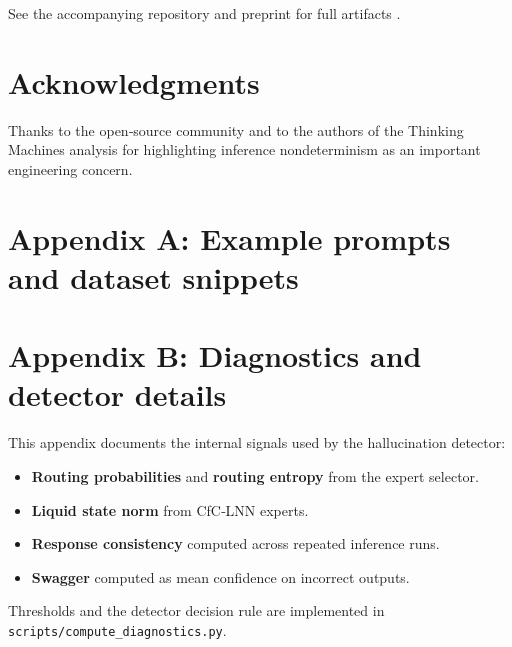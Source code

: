 \documentclass[11pt,a4paper]{article}
\begin{document}
See the accompanying repository and preprint for full artifacts \cite{damyanov2026}.

\nocite{*}

\begingroup
\raggedright
\printbibliography
\endgroup

\section*{Acknowledgments}
Thanks to the open‑source community and to the authors of the Thinking Machines analysis for highlighting inference nondeterminism as an important engineering concern.

\appendix
\section{Appendix A: Example prompts and dataset snippets}

\section{Appendix B: Diagnostics and detector details}
This appendix documents the internal signals used by the hallucination detector:
\begin{itemize}[noitemsep]
  \item \textbf{Routing probabilities} and \textbf{routing entropy} from the expert selector.
  \item \textbf{Liquid state norm} from CfC‑LNN experts.
  \item \textbf{Response consistency} computed across repeated inference runs.
  \item \textbf{Swagger} computed as mean confidence on incorrect outputs.
\end{itemize}
Thresholds and the detector decision rule are implemented in \texttt{scripts/compute\_diagnostics.py}.
\end{document}
